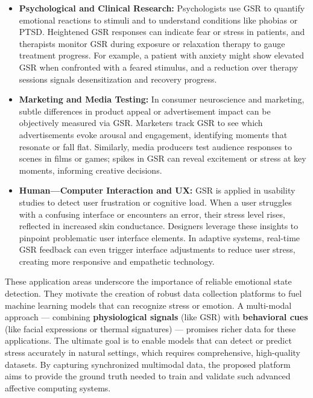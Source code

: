 \begin{itemize}
\item \textbf{Psychological and Clinical Research:} Psychologists use GSR to
  quantify emotional reactions to stimuli and to understand conditions
  like phobias or PTSD. Heightened GSR responses can indicate fear or
  stress in patients, and therapists monitor GSR during exposure or
  relaxation therapy to gauge treatment
  progress\cite{AppleHealthWatch2019}\cite{SamsungHealth2020}.
  For example, a patient with anxiety might show elevated GSR when
  confronted with a feared stimulus, and a reduction over therapy
  sessions signals desensitization and recovery progress.
\item \textbf{Marketing and Media Testing:} In consumer neuroscience and
  marketing, subtle differences in product appeal or advertisement
  impact can be objectively measured via GSR. Marketers track GSR to see
  which advertisements evoke arousal and engagement, identifying moments
  that resonate or fall
  flat\cite{Fowles1981}\cite{Healey2005}.
  Similarly, media producers test audience responses to scenes in films
  or games; spikes in GSR can reveal excitement or stress at key
  moments, informing creative decisions.
\item \textbf{Human---Computer Interaction and UX:} GSR is applied in usability
  studies to detect user frustration or cognitive load. When a user
  struggles with a confusing interface or encounters an error, their
  stress level rises, reflected in increased skin
  conductance\cite{Picard2001}.
  Designers leverage these insights to pinpoint problematic user
  interface elements. In adaptive systems, real-time GSR feedback can
  even trigger interface adjustments to reduce user stress, creating
  more responsive and empathetic technology.

\end{itemize}
These application areas underscore the importance of reliable emotional
state detection. They motivate the creation of robust data collection
platforms to fuel machine learning models that can recognize stress or
emotion. A multi-modal approach --- combining \textbf{physiological signals}
(like GSR) with \textbf{behavioral cues} (like facial expressions or thermal
signatures) --- promises richer data for these applications. The ultimate
goal is to enable models that can detect or predict stress accurately in
natural settings, which requires comprehensive, high-quality datasets.
By capturing synchronized multimodal data, the proposed platform aims to
provide the ground truth needed to train and validate such advanced
affective computing systems.

